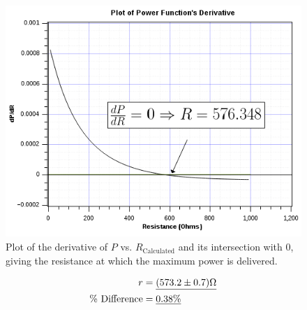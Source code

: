\documentclass[twocolumn,english]{IEEEtran}
\theoremstyle{plain}
\theoremstyle{plain}
\begin{document}
  \begin{figure}[htpb]
  \begin{centering}
  \begin{center}
  \includegraphics[width=\linewidth]{./Images/power_derivative.png}
  \caption{Plot of the derivative of $P$ vs. $R_{\text{Calculated}}$ and its intersection with 0, giving the resistance at which the maximum power is delivered.}
  \label{fig:power_derivative}
  \end{center}
  \par\end{centering}
  \end{figure}

  \begin{align*}
   r 				&= \text{\underline{$(573.2 \pm 0.7)\Omega$}}	\\
   \text{\% Difference} 	&= \text{\underline{0.38\%}}
  \end{align*}

  \noindent \hrulefill
\end{document}
